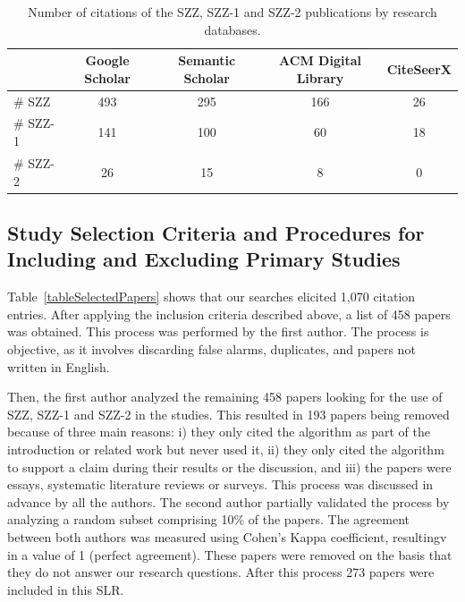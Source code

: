 \documentclass[a4paper, 12pt]{book}
\begin{document}
\begin{table}[!t]
\renewcommand{\arraystretch}{0.8}
\caption{Number of citations of the SZZ, SZZ-1 and SZZ-2 publications by research databases.}
\label{tableSearch}
\centering
\begin{adjustbox}{max width=\textwidth}
\begin{tabular}{|l|c|c|c|c|}
\hline
& Google Scholar & Semantic Scholar & ACM Digital Library & CiteSeerX \\
\hline
\hline
\# SZZ & 493 & 295 & 166 & 26 \\
\hline
\# SZZ-1 & 141 & 100 & 60 & 18 \\
\hline
\# SZZ-2 & 26 & 15 & 8 & 0 \\
\hline
\end{tabular}
\end{adjustbox}
\end{table}

\subsection{Study Selection Criteria and Procedures for Including and Excluding Primary Studies}
\label{subsec:selection}
Table~\ref{tableSelectedPapers} shows that our searches elicited 1,070 citation entries. After applying the inclusion criteria described above, a list of 458 papers was obtained. This process was performed by the first author. The process is objective, as it involves discarding false alarms, duplicates, and papers not written in English. 

Then, the first author analyzed the remaining 458 papers looking for the use of SZZ, SZZ-1 and SZZ-2 in the studies. This resulted in 193 papers being removed because of three main reasons: i) they only cited the algorithm as part of the introduction or related work but never used it, ii) they only cited the algorithm to support a claim during their results or the discussion, and iii) the papers were essays, systematic literature reviews or surveys. This process was discussed in advance by all the authors. The second author partially validated the process by analyzing a random subset comprising 10\% of the papers. The agreement between both authors was measured using Cohen's Kappa coefficient, resultingv in a value of 1 (perfect agreement). These papers were removed on the basis that they do not answer our research questions. After this process 273 papers were included in this SLR.
\end{document}
